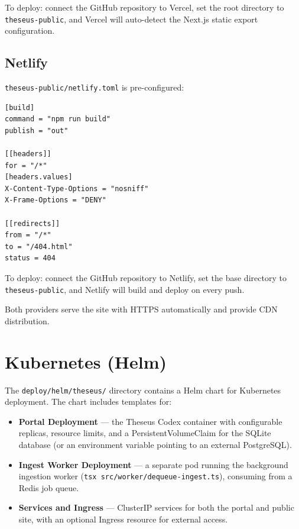 \documentclass[11pt,letterpaper]{article}
\newcommand{\file}[1]{\texttt{#1}}
\newcommand{\cmd}[1]{\texttt{#1}}
\begin{document}
To deploy: connect the GitHub repository to Vercel, set the root directory to \file{theseus-public}, and Vercel will auto-detect the Next.js static export configuration.

\subsection{Netlify}

\file{theseus-public/netlify.toml} is pre-configured:

\begin{lstlisting}
[build]
command = "npm run build"
publish = "out"

[[headers]]
for = "/*"
[headers.values]
X-Content-Type-Options = "nosniff"
X-Frame-Options = "DENY"

[[redirects]]
from = "/*"
to = "/404.html"
status = 404
\end{lstlisting}

To deploy: connect the GitHub repository to Netlify, set the base directory to \file{theseus-public}, and Netlify will build and deploy on every push.

Both providers serve the site with HTTPS automatically and provide CDN distribution.

\section{Kubernetes (Helm)}

The \file{deploy/helm/theseus/} directory contains a Helm chart for Kubernetes deployment. The chart includes templates for:

\begin{itemize}[leftmargin=1.5em,itemsep=0.1em]
  \item \textbf{Portal Deployment} --- the Theseus Codex container with configurable replicas, resource limits, and a PersistentVolumeClaim for the SQLite database (or an environment variable pointing to an external PostgreSQL).
  \item \textbf{Ingest Worker Deployment} --- a separate pod running the background ingestion worker (\cmd{tsx src/worker/dequeue-ingest.ts}), consuming from a Redis job queue.
  \item \textbf{Services and Ingress} --- ClusterIP services for both the portal and public site, with an optional Ingress resource for external access.
\end{itemize}
\end{document}
